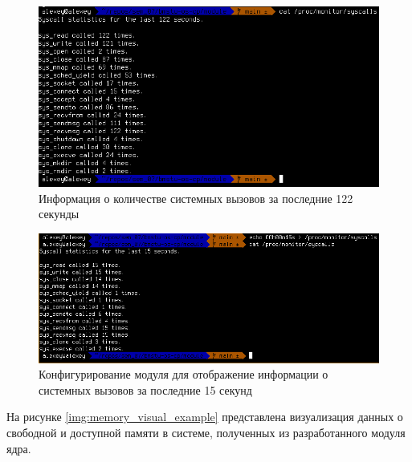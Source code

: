 \begin{figure}[h!]
	\begin{center}
		\includegraphics[scale=0.6]{img/syscalls_example_01.png}
	\end{center}
	\captionsetup{justification=centering}
	\caption{Информация о количестве системных вызовов за последние 122 секунды}
	\label{img:syscalls_example_01}
\end{figure}

\begin{figure}[h!]
	\begin{center}
		\includegraphics[scale=0.55]{img/syscalls_example_02.png}
	\end{center}
	\captionsetup{justification=centering}
	\caption{Конфигурирование модуля для отображение информации о системных вызовов за последние 15 секунд}
	\label{img:syscalls_example_02}
\end{figure}

На рисунке \ref{img:memory_visual_example} представлена визуализация данных о свободной и доступной памяти в системе, полученных из разработанного модуля ядра.

